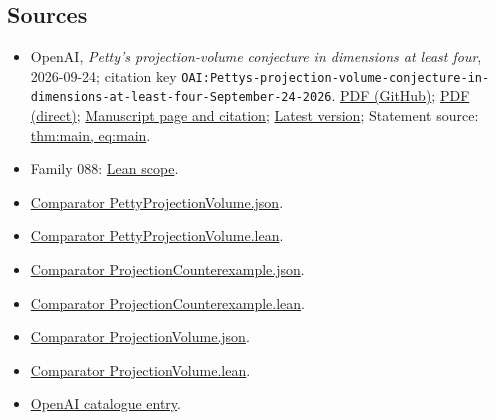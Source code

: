 \documentclass[11pt]{article}
\begin{document}
\subsection{Sources}
\begin{itemize}
\item OpenAI, \emph{Petty's projection-volume conjecture in dimensions at least four}, 2026-09-24; citation key \texttt{OAI:Pettys-projection-volume-conjecture-in-dimensions-at-least-four-September-24-2026}. \href{https://github.com/openai/math/blob/adc7f1241b42e322a6451854ab7e4b4c146bf78a/preprints/Pettys-projection-volume-conjecture-in-dimensions-at-least-four-September-24-2026/paper.pdf}{PDF (GitHub)}; \href{https://github.com/openai/math/raw/adc7f1241b42e322a6451854ab7e4b4c146bf78a/preprints/Pettys-projection-volume-conjecture-in-dimensions-at-least-four-September-24-2026/paper.pdf}{PDF (direct)}; \href{https://github.com/openai/math/blob/adc7f1241b42e322a6451854ab7e4b4c146bf78a/preprints/Pettys-projection-volume-conjecture-in-dimensions-at-least-four-September-24-2026/README.md}{Manuscript page and citation}; \href{https://github.com/openai/math/blob/main/preprints/Pettys-projection-volume-conjecture-in-dimensions-at-least-four-September-24-2026/paper.pdf}{Latest version}; Statement source: \href{https://github.com/openai/math/blob/adc7f1241b42e322a6451854ab7e4b4c146bf78a/preprints/Pettys-projection-volume-conjecture-in-dimensions-at-least-four-September-24-2026/build/latex/sections/01\_introduction.tex\#L36}{thm:main, eq:main}.
\item Family 088: \href{https://github.com/openai/math/blob/adc7f1241b42e322a6451854ab7e4b4c146bf78a/lean/docs/088.md}{Lean scope}.
\item \href{https://github.com/openai/math/blob/adc7f1241b42e322a6451854ab7e4b4c146bf78a/lean/ComparatorChallenges/PettyProjectionVolume.json}{Comparator PettyProjectionVolume.json}.
\item \href{https://github.com/openai/math/blob/adc7f1241b42e322a6451854ab7e4b4c146bf78a/lean/ComparatorChallenges/PettyProjectionVolume.lean}{Comparator PettyProjectionVolume.lean}.
\item \href{https://github.com/openai/math/blob/adc7f1241b42e322a6451854ab7e4b4c146bf78a/lean/ComparatorChallenges/ProjectionCounterexample.json}{Comparator ProjectionCounterexample.json}.
\item \href{https://github.com/openai/math/blob/adc7f1241b42e322a6451854ab7e4b4c146bf78a/lean/ComparatorChallenges/ProjectionCounterexample.lean}{Comparator ProjectionCounterexample.lean}.
\item \href{https://github.com/openai/math/blob/adc7f1241b42e322a6451854ab7e4b4c146bf78a/lean/ComparatorChallenges/ProjectionVolume.json}{Comparator ProjectionVolume.json}.
\item \href{https://github.com/openai/math/blob/adc7f1241b42e322a6451854ab7e4b4c146bf78a/lean/ComparatorChallenges/ProjectionVolume.lean}{Comparator ProjectionVolume.lean}.
\item \href{https://github.com/openai/math/blob/adc7f1241b42e322a6451854ab7e4b4c146bf78a/CONTENTS.md}{OpenAI catalogue entry}.
\end{itemize}
\end{document}
